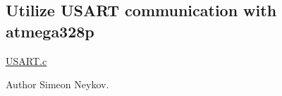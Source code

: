 \subsection*{Utilize U\+S\+A\+RT communication with atmega328p}

\mbox{\hyperlink{_u_s_a_r_t_8c}{U\+S\+A\+R\+T.\+c}}

\begin{DoxyAuthor}{Author}
Simeon Neykov. 
\end{DoxyAuthor}
